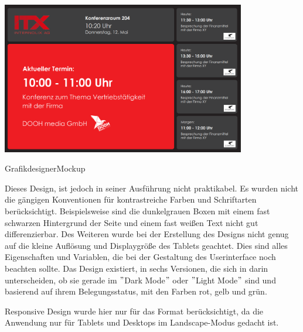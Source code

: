 \newline
\par\vspace{1cm}
\centering
\includegraphics[width=0.8\textwidth]{Bilder/GrafikdesignerMockup}
\caption{GrafikdesignerMockup}
\label{fig:GrafikdesignerMockup}
\par\vspace{1cm}
\raggedright
Dieses Design, ist jedoch in seiner Ausführung nicht praktikabel.
Es wurden nicht die gängigen Konventionen für kontrastreiche Farben und Schriftarten berücksichtigt.
Beispielsweise sind die dunkelgrauen Boxen mit einem fast schwarzen Hintergrund der Seite und einem fast weißen Text nicht gut differenzierbar.
Des Weiteren wurde bei der Erstellung des Designs nicht genug auf die kleine Auflösung und Displaygröße des Tablets geachtet.
Dies sind alles Eigenschaften und Variablen, die bei der Gestaltung des Userinterface noch beachten sollte.
\newline
Das Design existiert, in sechs Versionen, die sich in darin unterscheiden, ob sie gerade im \("\)Dark Mode\("\) oder \("\)Light Mode\("\) sind und basierend auf ihrem Belegungsstatus, mit den Farben rot, gelb und grün.
\newline
{}

\gls{Responsive Design} wurde hier nur für das Format berücksichtigt, da die Anwendung nur für Tablets und Desktops im Landscape-Modus gedacht ist.

